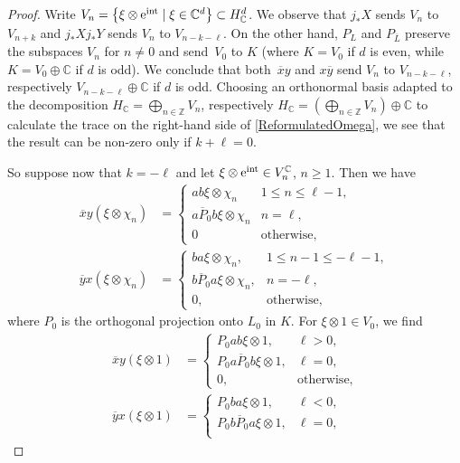 \documentclass[pdftex]{sigma}
\numberwithin{equation}{section}
\newcommand{\Z}{\mathbb{Z}}
\newcommand{\C}{\mathbb{C}}
\begin{document}
\begin{proof}
Write $V_n = \big\{\xi \otimes {\rm e}^{\rm int} \mid \xi \in \C^d\big\} \subset H^d_\C$.
We observe that $j_*X$ sends $V_n$ to $V_{n+k}$ and $j_*Xj_*Y$ sends $V_n$ to $V_{n-k-\ell}$.
On the other hand, $P_L$ and $P_{\overline{L}}$ preserve the subspaces $V_n$ for $n \neq 0$ and send~$V_0$ to $K$ (where $K = V_0$ if $d$ is even, while $K = V_0 \oplus \C$ if $d$ is odd).
We conclude that both~$\overline{x} y$ and $x \overline{y}$ send $V_n$ to $V_{n-k-\ell}$, respectively $V_{n-k-\ell} \oplus \C$ if $d$ is odd.
Choosing an orthonormal basis adapted to the decomposition $H_\C = \bigoplus_{n \in \Z} V_n$, respectively $H_\C = (\bigoplus_{n \in \Z} V_n) \oplus \C$ to calculate the trace on the right-hand side of \eqref{ReformulatedOmega}, we see that the result can be non-zero only if $k+\ell = 0$.

So suppose now that $k = - \ell$ and let $\xi \otimes {\rm e}^{{\rm int}} \in V_n^\C$, $n \geq 1$. Then we have
\begin{align*}
 \overline{x}y(\xi\otimes \chi_n) &=
 \begin{cases}
 ab\xi \otimes \chi_{n} & 1 \leq n \leq \ell -1, \\
 a\overline{P}_0b\xi \otimes \chi_{n} & n = \ell,\\
 0 & \text{otherwise},
 \end{cases}
 \\
 \overline{y}x(\xi \otimes \chi_n) &=
 \begin{cases}
 ba\xi \otimes \chi_{n}, & 1 \leq n -1 \leq -\ell -1, \\
 b\overline{P}_0a\xi \otimes \chi_{n}, & n = - \ell,\\
 0, & \text{otherwise},
 \end{cases}	
\end{align*}
where $P_0$ is the orthogonal projection onto $L_0$ in $K$.
For $\xi \otimes 1 \in V_0$, we find
\begin{align*}
 \overline{x}y(\xi\otimes 1) &=
 \begin{cases}
 P_0ab\xi \otimes 1, & \ell > 0, \\
 P_0a\overline{P}_0b\xi \otimes 1, & \ell = 0,\\
 0, & \text{otherwise},
 \end{cases}
 \\
 \overline{y}x(\xi \otimes 1) &=
 \begin{cases}
 P_0ba\xi \otimes 1, & \ell < 0, \\
 P_0b\overline{P}_0a\xi \otimes 1, & \ell = 0,\\

\end{cases}
\end{align*}
\end{proof}
\end{document}
